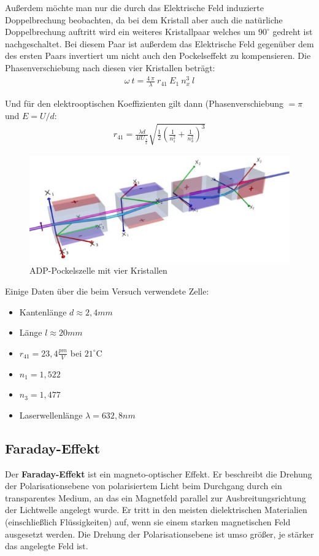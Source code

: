 \documentclass[12pt]{article}
\begin{document}
Außerdem möchte man nur die durch das Elektrische Feld induzierte Doppelbrechung beobachten, da bei dem Kristall aber auch die natürliche Doppelbrechung auftritt wird ein weiteres Kristallpaar welches um $90^\circ$ gedreht ist nachgeschaltet. Bei diesem Paar ist außerdem das Elektrische Feld gegenüber dem des ersten Paars invertiert um nicht auch den Pockelseffekt zu kompensieren. Die Phasenverschiebung nach diesen vier Kristallen beträgt:
\begin{align}
 \omega~t = \frac{4~\pi}{\lambda}~r_{41}~E_1~n_x^3~l
\end{align}

Und für den elektrooptischen Koeffizienten gilt dann (Phasenverschiebung $= \pi$ und $E = U/d$:
\begin{align}
 r_{41} = \frac{\lambda d}{4 l U_{\frac{\lambda}{2}}} \sqrt{\frac{1}{2} \left( \frac{1}{n_1^2} + \frac{1}{n_3^2}\right)^3}
\end{align}

\begin{figure}[H]
\centering
\includegraphics[width=1\linewidth]{pictures/adp-zelle.eps}
\caption{ADP-Pockelszelle mit vier Kristallen}
\end{figure}

Einige Daten über die beim Versuch verwendete Zelle:
\begin{itemize}
 \item Kantenlänge $d \approx 2,4 mm$
 \item Länge $l \approx 20 mm$
 \item $r_{41} = 23,4 \frac{pm}{V}$ bei $21^\circ$C
 \item $n_1 = 1,522$
 \item $n_3 = 1,477$
 \item Laserwellenlänge $\lambda = 632,8 nm$
\end{itemize}

\subsection{Faraday-Effekt}
Der \textbf{Faraday-Effekt} ist ein magneto-optischer Effekt. Er beschreibt die Drehung der Polarisationsebene von polarisiertem Licht beim Durchgang durch ein transparentes Medium, an das ein Magnetfeld parallel zur Ausbreitungsrichtung der Lichtwelle angelegt wurde. Er tritt in den meisten dielektrischen Materialien (einschließlich Flüssigkeiten) auf, wenn sie einem starken magnetischen Feld ausgesetzt werden. Die Drehung der Polarisationsebene ist umso größer, je stärker das angelegte Feld ist.
\end{document}
